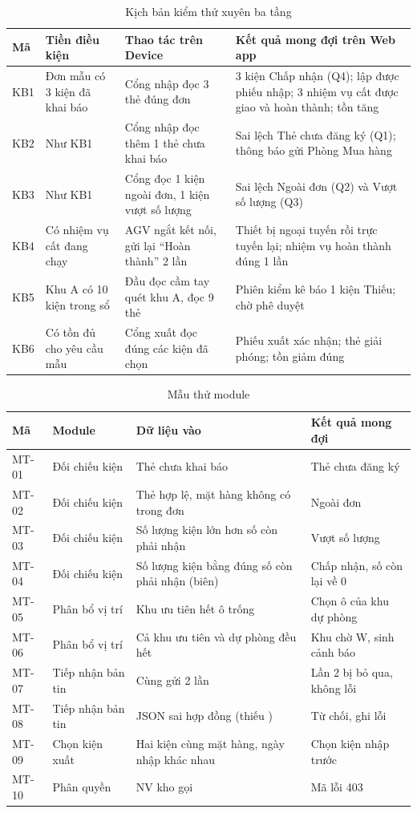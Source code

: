\begin{table}[H]
\centering
\caption{Kịch bản kiểm thử xuyên ba tầng}
\label{tab:kichban}
\small
\begin{tabularx}{\textwidth}{l L{3.2cm} L{4.0cm} Y}
\toprule
\textbf{Mã} & \textbf{Tiền điều kiện} & \textbf{Thao tác trên Device} & \textbf{Kết quả mong đợi trên Web app} \\
\midrule
KB1 & Đơn mẫu có 3 kiện đã khai báo & Cổng nhập đọc 3 thẻ đúng đơn & 3 kiện Chấp nhận (Q4); lập được phiếu nhập; 3 nhiệm vụ cất được giao và hoàn thành; tồn tăng \\
KB2 & Như KB1 & Cổng nhập đọc thêm 1 thẻ chưa khai báo & Sai lệch Thẻ chưa đăng ký (Q1); thông báo gửi Phòng Mua hàng \\
KB3 & Như KB1 & Cổng đọc 1 kiện ngoài đơn, 1 kiện vượt số lượng & Sai lệch Ngoài đơn (Q2) và Vượt số lượng (Q3) \\
KB4 & Có nhiệm vụ cất đang chạy & AGV ngắt kết nối, gửi lại “Hoàn thành” 2 lần & Thiết bị ngoại tuyến rồi trực tuyến lại; nhiệm vụ hoàn thành đúng 1 lần \\
KB5 & Khu A có 10 kiện trong sổ & Đầu đọc cầm tay quét khu A, đọc 9 thẻ & Phiên kiểm kê báo 1 kiện Thiếu; chờ phê duyệt \\
KB6 & Có tồn đủ cho yêu cầu mẫu & Cổng xuất đọc đúng các kiện đã chọn & Phiếu xuất xác nhận; thẻ giải phóng; tồn giảm đúng \\
\bottomrule
\end{tabularx}
\end{table}

\begin{table}[H]
\centering
\caption{Mẫu thử module}
\label{tab:mtmodule}
\small
\begin{tabularx}{\textwidth}{l L{3.0cm} Y L{4.4cm}}
\toprule
\textbf{Mã} & \textbf{Module} & \textbf{Dữ liệu vào} & \textbf{Kết quả mong đợi} \\
\midrule
MT-01 & Đối chiếu kiện & Thẻ chưa khai báo & Thẻ chưa đăng ký \\
MT-02 & Đối chiếu kiện & Thẻ hợp lệ, mặt hàng không có trong đơn & Ngoài đơn \\
MT-03 & Đối chiếu kiện & Số lượng kiện lớn hơn số còn phải nhận & Vượt số lượng \\
MT-04 & Đối chiếu kiện & Số lượng kiện bằng đúng số còn phải nhận (biên) & Chấp nhận, số còn lại về 0 \\
MT-05 & Phân bổ vị trí & Khu ưu tiên hết ô trống & Chọn ô của khu dự phòng \\
MT-06 & Phân bổ vị trí & Cả khu ưu tiên và dự phòng đều hết & Khu chờ W, sinh cảnh báo \\
MT-07 & Tiếp nhận bản tin & Cùng  gửi 2 lần & Lần 2 bị bỏ qua, không lỗi \\
MT-08 & Tiếp nhận bản tin & JSON sai hợp đồng (thiếu ) & Từ chối, ghi lỗi \\
MT-09 & Chọn kiện xuất & Hai kiện cùng mặt hàng, ngày nhập khác nhau & Chọn kiện nhập trước \\
MT-10 & Phân quyền & NV kho gọi  & Mã lỗi 403 \\
\bottomrule
\end{tabularx}
\end{table}

